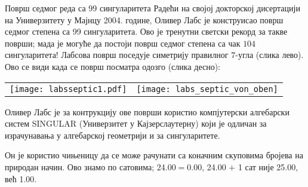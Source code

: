 \begin{surferPage}[99 сингуларитета]{Површ седмог реда са 99 сингуларитета}
    Радећи на својој докторској дисертацији на Универзитету у Мајнцу 2004. године, 
	Оливер Лабс је конструисао површ седмог степена са 99 сингуларитета. 
	Ово је тренутни светски рекорд за такве површи; мада је могуће да постоји површ 
	седмог степена са чак $104$ сингуларитета!  
    Лабсова површ поседује симетрију правилног $7$-угла (слика лево).
    Ово се види када се површ посматра одозго (слика десно):

    \vspace*{-0.3em}
    \begin{center}
      \begin{tabular}{c@{\qquad}c}
        \texttt{[image: labsseptic1.pdf]}
        &
        \texttt{[image: labs\_septic\_von\_oben]}
      \end{tabular}
    \end{center}
    \vspace*{-0.3em}

    Оливер Лабс је за контрукцију ове површи користио компјутерски алгебарски систем 
    SINGULAR (Универзитет у Кајзерслаутерну) који је одличан за израчунавања у 
	алгебарској геометрији и за сингуларитете.

    Он је користио чињеницу да се може рачунати са коначним скуповима бројева на 
    природан начин. Ово знамо по сатовима; 24.00$=$0.00, 24.00 $+$ 1 сат није
    25.00, већ 1.00.
\end{surferPage}
